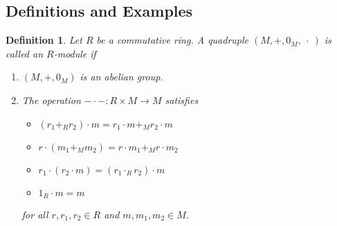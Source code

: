 \documentclass{article}
\theoremstyle{plain}\theoremheaderfont{\normalfont\itshape}\theorembodyfont{\rmfamily}\theoremseparator{.}\newtheorem*{rem}{Remark}\newtheorem*{ex}{Example}\newtheorem*{proof}{Proof}\newtheorem*{altp}{Alternative proof}\newtheorem*{nonex}{Non-Example}
\theoremstyle{plain}\theoremheaderfont{\normalfont\bfseries}\theorembodyfont{\rmfamily}\theoremseparator{.}\newtheorem{thm}{Theorem}[section]\newtheorem{lem}[thm]{Lemma}\newtheorem{prop}[thm]{Proposition}\newtheorem*{cor}{Corollary}\newtheorem{defn}[thm]{Definition}\newtheorem{clm}[thm]{Claim}\newtheorem{clminproof}{Claim}\newtheorem*{notn}{Notation}\newtheorem*{exer}{Exercise}\newtheorem*{lemnn}{Lemma}
\theoremstyle{break}\theoremheaderfont{\normalfont\itshape}\theorembodyfont{\rmfamily}\theoremseparator{.\medskip}\newtheorem*{proofskip}{Proof}\newtheorem*{exs}{Examples}\newtheorem*{rems}{Remarks}\newtheorem*{obs}{Observations}
\theoremstyle{break}\theoremheaderfont{\normalfont\bfseries}\theorembodyfont{\rmfamily}\theoremseparator{.\medskip}\newtheorem{lemskip}[thm]{Lemma}\newtheorem{defnskip}[thm]{Definition}\newtheorem{propskip}[thm]{Proposition}\newtheorem{thmskip}[thm]{Theorem}
\numberwithin{equation}{section}
\begin{document}
    \subsection{Definitions and Examples}
    \begin{defn}
        Let \(R\) be a commutative ring. A quadruple \((M,+,0_M,\ \cdot \ )\) is called an \textit{\(R\)-module} if
        \begin{enumerate}[topsep=0pt,label=(\roman*)]
            \item \((M,+,0_M)\) is an abelian group.
            \item The operation \(-\cdot -:R\times M\to M\) satisfies
            \begin{itemize}[topsep=0pt]
                \item \((r_1+_R r_2)\cdot m=r_1\cdot m+_M r_2\cdot m\)
                \item \(r\cdot(m_1+_M m_2)=r\cdot m_1 +_M r\cdot m_2\)
                \item \(r_1\cdot(r_2\cdot m)=(r_1\cdot_R r_2)\cdot m\)
                \item \(1_R\cdot m=m\)
            \end{itemize}
            for all \(r,r_1,r_2\in R\) and \(m,m_1,m_2\in M\).
        \end{enumerate}
    \end{defn}
\end{document}
